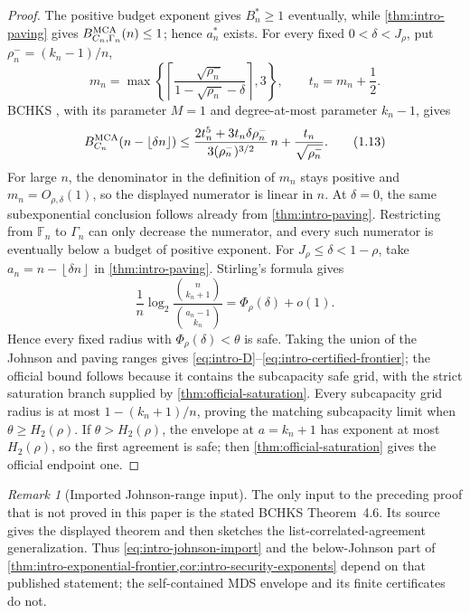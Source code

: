\documentclass[11pt,a4paper]{amsart}
\numberwithin{equation}{section}
\theoremstyle{remark}
\newtheorem{remark}[remark]{Remark}
\newcommand{\F}{\mathbb F}
\newcommand{\floor}[1]{\left\lfloor #1\right\rfloor}
\begin{document}
\begin{proof}
The positive budget exponent gives \(B_n^*\ge1\) eventually, while
\cref{thm:intro-paving} gives
\(B_{C_n,\Gamma_n}^{\rm MCA}(n)\le1\); hence \(a_n^*\) exists.
For every fixed \(0<\delta<J_\rho\), put
\(\rho_n^-=(k_n-1)/n\),
\[
 m_n=\max\left\{\left\lceil
 \frac{\sqrt{\rho_n^-}}{1-\sqrt{\rho_n^-}-\delta}
 \right\rceil,3\right\},\qquad t_n=m_n+\frac12.
\]
BCHKS \cite[Thm.~4.6]{BCHKS25}, with its parameter \(M=1\) and
degree-at-most parameter \(k_n-1\), gives
\[
 B_{C_n}^{\rm MCA}(n-\floor{\delta n})
 \le
 \frac{2t_n^5+3t_n\delta\rho_n^-}
      {3(\rho_n^-)^{3/2}}\,n
 +\frac{t_n}{\sqrt{\rho_n^-}}.                   \tag{1.13}
 \label{eq:intro-johnson-import}
\]
For large \(n\), the denominator in the definition of \(m_n\) stays
positive and \(m_n=O_{\rho,\delta}(1)\), so the displayed numerator is
linear in \(n\).  At \(\delta=0\), the same subexponential conclusion
follows already from \cref{thm:intro-paving}.  Restricting from \(\F_n\)
to \(\Gamma_n\) can only decrease the numerator, and every such numerator
is eventually below a budget of positive exponent.  For
\(J_\rho\le\delta<1-\rho\), take
\(a_n=n-\floor{\delta n}\) in \cref{thm:intro-paving}.  Stirling's
formula gives
\[
 \frac1n\log_2
 \frac{\binom n{k_n+1}}{\binom{a_n-1}{k_n}}
 =\Phi_\rho(\delta)+o(1).                          \tag{1.14}
 \label{eq:intro-paving-stirling}
\]
Hence every fixed radius with \(\Phi_\rho(\delta)<\theta\) is safe.
Taking the union of the Johnson and paving ranges gives
\eqref{eq:intro-D}--\eqref{eq:intro-certified-frontier}; the official
bound follows because it contains the subcapacity safe grid, with the strict
saturation branch supplied by \cref{thm:official-saturation}.
Every subcapacity grid radius is at most \(1-(k_n+1)/n\), proving the
matching subcapacity limit when \(\theta\ge H_2(\rho)\).  If
\(\theta>H_2(\rho)\), the envelope at \(a=k_n+1\) has exponent at most
\(H_2(\rho)\), so the first agreement is safe; then
\cref{thm:official-saturation} gives the official endpoint one.
\end{proof}

\begin{remark}[Imported Johnson-range input]
\label{rem:bchks-theorem46-provenance}
The only input to the preceding proof that is not proved in this paper is
the stated BCHKS Theorem~4.6.  Its source gives the displayed theorem and
then sketches the list-correlated-agreement generalization.  Thus
\eqref{eq:intro-johnson-import} and the below-Johnson part of
\cref{thm:intro-exponential-frontier,cor:intro-security-exponents} depend on
that published statement; the self-contained MDS envelope and its finite
certificates do not.
\end{remark}
\end{document}
